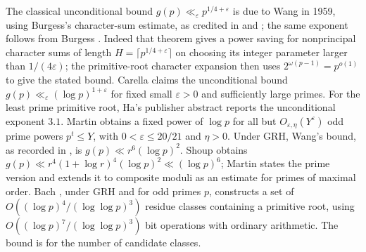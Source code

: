 \documentclass[11pt]{article}
\theoremstyle{definition}
\begin{document}
The classical unconditional bound
$g(p)\ll_\varepsilon p^{1/4+\varepsilon}$ is due to Wang in 1959,
using Burgess's character-sum estimate, as credited in
\cite[\S1]{Bach1997} and \cite[\S1]{FGG2026}; the same exponent
follows from Burgess \cite[Theorem~1]{Burgess1962}.
Indeed that theorem gives a power saving for nonprincipal character
sums of length $H=\lceil p^{1/4+\varepsilon}\rceil$ on choosing its integer parameter
larger than $1/(4\varepsilon)$; the primitive-root character expansion
then uses $2^{\omega(p-1)}=p^{o(1)}$ to give the stated bound.
Carella \cite[Theorem~1.1]{Carella2025} claims the unconditional bound
$g(p)\ll_\varepsilon(\log p)^{1+\varepsilon}$ for fixed small
$\varepsilon>0$ and sufficiently large primes.
For the least prime primitive root, Ha's publisher abstract
\cite{Ha2013} reports the unconditional exponent $3.1$.
Martin \cite[Theorem~1]{Martin1997} obtains a fixed power of $\log p$
for all but $O_{\varepsilon,\eta}(Y^{\varepsilon})$ odd prime powers
$p^t\le Y$, with $0<\varepsilon\le20/21$ and $\eta>0$.
Under GRH, Wang's bound, as recorded in \cite[\S1]{Shoup1992}, is
$g(p)\ll r^6(\log p)^2$. Shoup \cite[Theorem~3]{Shoup1992} obtains
$g(p)\ll r^4(1+\log r)^4(\log p)^2\ll(\log p)^6$;
Martin \cite[Corollary~3.1]{Martin1997} states the prime version and
extends it to composite moduli as an estimate for primes of maximal order.
Bach \cite[Theorem~3.2]{Bach1997}, under GRH and for odd primes $p$,
constructs a set of $O((\log p)^4/(\log\log p)^3)$ residue classes
containing a primitive root, using
$O((\log p)^7/(\log\log p)^3)$ bit operations with ordinary arithmetic.
The bound is for the number of candidate classes.

\appendix
\end{document}
